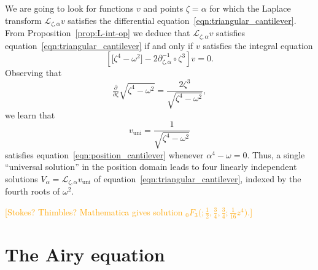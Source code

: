 \documentclass{article}
\newcommand{\fracderiv}[3]{\partial^{#1}_{#2, #3}}
\newcommand{\laplace}{\mathcal{L}}
\theoremstyle{definition}
\theoremstyle{plain}
\begin{document}
\color{black}
We are going to look for functions $v$ and points $\zeta = \alpha$ for which the Laplace transform $\laplace_{\zeta, \alpha} v$ satisfies the differential equation~\eqref{eqn:triangular_cantilever}. From Proposition~\ref{prop:L-int-op} we deduce that $\laplace_{\zeta, \alpha} v$ satisfies equation~\eqref{eqn:triangular_cantilever} if and only if $v$ satisfies the integral equation
\begin{equation}\label{eqn:position_cantilever}
    \left[ \big[ \zeta^4 - \omega^2 \big] - 2\fracderiv{-1}{\zeta}{\alpha} \circ \zeta^3 \right] v = 0.
\end{equation}
Observing that
\[ \tfrac{\partial}{\partial \zeta} \sqrt{\zeta^4 - \omega^2} = \frac{2\zeta^3}{\sqrt{\zeta^4 - \omega^2}}, \]
we learn that
\[ v_\text{uni} = \frac{1}{\sqrt{\zeta^4 - \omega^2}} \]
satisfies equation~\eqref{eqn:position_cantilever} whenever $\alpha^4 - \omega = 0$. Thus, a single ``universal solution'' in the position domain leads to four linearly independent solutions $V_\alpha = \laplace_{\zeta, \alpha} v_\text{uni}$ of equation~\eqref{eqn:triangular_cantilever}, indexed by the fourth roots of $\omega^2$.
\par\textcolor{orange}{[Stokes? Thimbles? Mathematica gives solution ${}_0 F_3\big(; \tfrac{1}{2}, \tfrac{3}{4}, \tfrac{3}{4}; \tfrac{1}{16} z^4\big)$.]}
%
\appendix
%
\section{The Airy equation}\label{airy-appendix}
%
\end{document}
